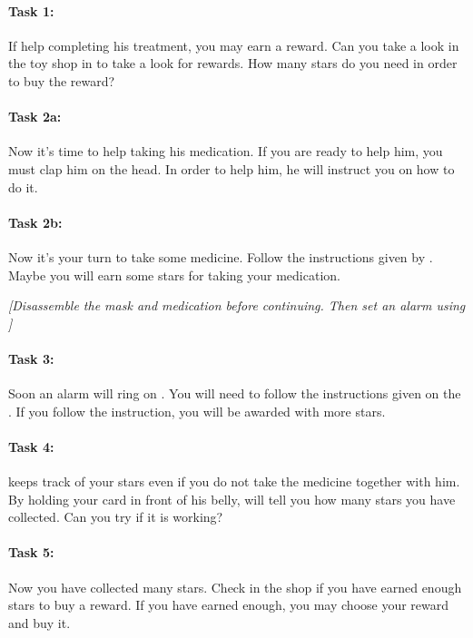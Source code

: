 \paragraph{Task 1:}

If help \ab{} completing his treatment, you may earn a reward. Can you take a look in the toy shop in \app{} to take a look for rewards. How many stars do you need in order to buy the reward?


\paragraph{Task 2a:}

Now it's time to help \ab{} taking his medication. If you are ready to help him, you must clap him on the head. In order to help him, he will instruct you on how to do it. 


\paragraph{Task 2b:}

Now it's your turn to take some medicine. Follow the instructions given by \ab{}. Maybe you will earn some stars for taking your medication.

\emph{[Disassemble the mask and medication before continuing. Then set an alarm using \app{}]}


\paragraph{Task 3:}

Soon an alarm will ring on \app{}. You will need to follow the instructions given on the \app{}. If you follow the instruction, you will be awarded with more stars. 


\paragraph{Task 4:} 
\ab{} keeps track of your stars even if you do not take the medicine together with him. By holding your card in front of his belly, \ab{} will tell you how many stars you have collected. Can you try if it is working?


\paragraph{Task 5:}
Now you have collected many stars. Check in the shop if you have earned enough stars to buy a reward. If you have earned enough, you may choose your reward and buy it. 


